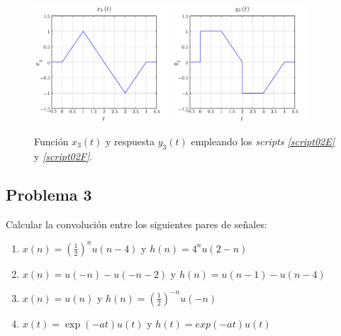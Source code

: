 \documentclass[a4paper,12pt,final]{article}
\begin{document}
      \begin{figure}[H]
          \caption{Función $x_3\left(t\right)$ y respuesta $y_3\left(t\right)$ empleando los \emph{scripts \ref{script02E}} y \emph{\ref{script02F}}.}
          \label{script02Bfigure}
          \begin{center}
              \includegraphics[width=0.45\textwidth]{./laboratorio_3/problema02_X3.png}
              \includegraphics[width=0.45\textwidth]{./laboratorio_3/problema02_Y3.png}
          \end{center}
      \end{figure}
      \vspace{\fill}

  \newpage
  \subsection*{Problema 3}
    \noindent Calcular la convolución entre los siguientes pares de señales:
    \begin{enumerate}[label=\alph*)]
      \item $x\left(n\right) = \left(\frac{1}{2}\right)^n u\left(n-4\right)$ y $h\left(n\right) = 4^n u\left(2-n\right)$
      \item $x\left(n\right) = u\left(-n\right) - u\left(-n-2\right)$ y $h\left(n\right) = u\left(n-1\right) - u\left(n-4\right)$
      \item $x\left(n\right) = u\left(n\right)$ y $h\left(n\right) = \left(\frac{1}{2}\right)^{-n} u\left(-n\right)$
      \item $x\left(t\right) = \exp\left(-at\right) u(t)$ y $h(t) = exp(-at) u(t)$
    \end{enumerate}
\end{document}
